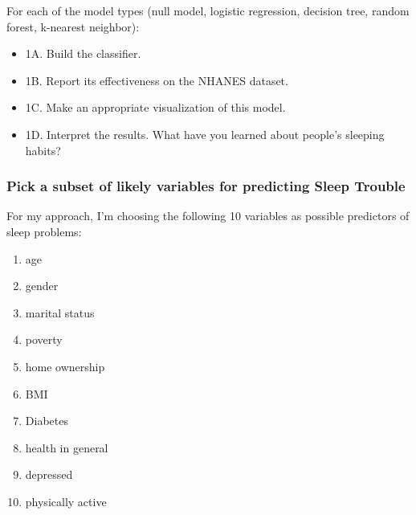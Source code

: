 \documentclass[]{article}
\newenvironment{Shaded}{\begin{snugshade}}{\end{snugshade}}
\newcommand{\KeywordTok}[1]{\textcolor[rgb]{0.13,0.29,0.53}{\textbf{{#1}}}}
\newcommand{\StringTok}[1]{\textcolor[rgb]{0.31,0.60,0.02}{{#1}}}
\newcommand{\CommentTok}[1]{\textcolor[rgb]{0.56,0.35,0.01}{\textit{{#1}}}}
\newcommand{\NormalTok}[1]{{#1}}
\providecommand{\tightlist}{%
  \setlength{\itemsep}{0pt}\setlength{\parskip}{0pt}}
\begin{document}
For each of the model types (null model, logistic regression, decision
tree, random forest, k-nearest neighbor):

\begin{itemize}
\tightlist
\item
  1A. Build the classifier.
\item
  1B. Report its effectiveness on the NHANES dataset.
\item
  1C. Make an appropriate visualization of this model.
\item
  1D. Interpret the results. What have you learned about people's
  sleeping habits?
\end{itemize}

\subsubsection{Pick a subset of likely variables for predicting Sleep
Trouble}\label{pick-a-subset-of-likely-variables-for-predicting-sleep-trouble}

For my approach, I'm choosing the following 10 variables as possible
predictors of sleep problems:

\begin{enumerate}
\def\labelenumi{\arabic{enumi}.}
\tightlist
\item
  age
\item
  gender
\item
  marital status
\item
  poverty
\item
  home ownership
\item
  BMI
\item
  Diabetes
\item
  health in general
\item
  depressed
\item
  physically active
\end{enumerate}

\begin{Shaded}
\end{Shaded}
\end{document}
